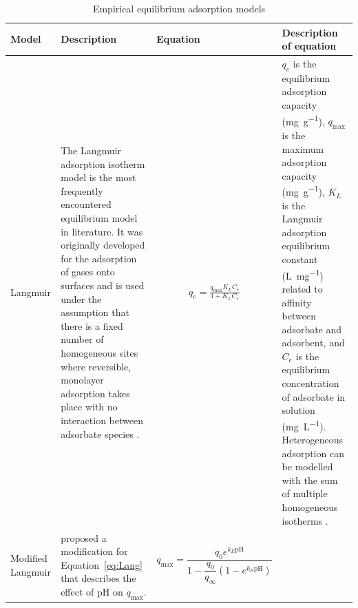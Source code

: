 \begin{landscape}
	\setlength{\extrarowheight}{0.2cm}
	\begin{footnotesize}
		\begin{longtable}{>{\raggedright\arraybackslash}p{2cm}p{7.25cm}p{4.5cm}p{7.25cm}}
			
			\caption{Empirical equilibrium adsorption models}
			\label{tab:emp_eq} \\
			
			
			\toprule
			Model  & Description & Equation & Description of equation  \\
			\toprule
			\endhead
			
			\bottomrule
			\endfoot
			
			Langmuir 
			
			& The Langmuir adsorption isotherm model is the most frequently encountered equilibrium model in literature. It was originally developed for the adsorption of gases onto surfaces and is used under the assumption that there is a fixed number of homogeneous sites where reversible, monolayer adsorption takes place with no interaction between adsorbate species \parencite{Langmuir1918}. 
			
			& \begin{align}
			q_e=\frac{q_{\mathrm{max}}K_LC_e}{1+K_LC_e} \label{eq:Lang}
			\end{align} 
			
			& $q_e$ is the equilibrium adsorption capacity (\si{\milli\gram\per\gram}), $q_{\mathrm{max}}$ is the maximum adsorption capacity (\si{\milli\gram\per\gram}), $K_L$ is the Langmuir adsorption equilibrium constant (\si{\liter\per\milli\gram}) related to affinity between adsorbate and adsorbent, and $C_e$ is the equilibrium concentration of adsorbate in solution (\si{\milli\gram\per\liter}). Heterogeneous adsorption can be modelled with the sum of multiple homogeneous isotherms \parencite{Langmuir1918}. \\
			
		
			Modified Langmuir
			
			& \textcite{Esposito2002} proposed a modification for Equation~\ref{eq:Lang} that describes the effect of pH on $ q_\mathrm{max} $.
			
			& \begin{equation}
			q_\mathrm{max} = \frac{q_0e^{k_E \text{pH}}}{1 - \dfrac{q_0}{q_\infty} \left( 1-e^{k_E \text{pH}}\right)}
			\end{equation} 
			

\end{longtable}
\end{footnotesize}
\end{landscape}

